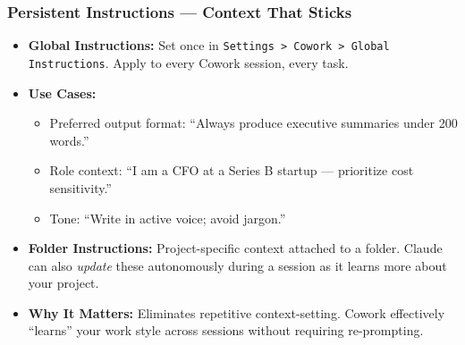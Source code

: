 \begin{frame}[fragile]\frametitle{Persistent Instructions — Context That Sticks}
  \begin{itemize}
    \item \textbf{Global Instructions:} Set once in \texttt{Settings > Cowork > Global Instructions}. Apply to every Cowork session, every task.
    \item \textbf{Use Cases:}
      \begin{itemize}
        \item Preferred output format: ``Always produce executive summaries under 200 words.''
        \item Role context: ``I am a CFO at a Series B startup — prioritize cost sensitivity.''
        \item Tone: ``Write in active voice; avoid jargon.''
      \end{itemize}
    \item \textbf{Folder Instructions:} Project-specific context attached to a folder. Claude can also \textit{update} these autonomously during a session as it learns more about your project.
    \item \textbf{Why It Matters:} Eliminates repetitive context-setting. Cowork effectively ``learns'' your work style across sessions without requiring re-prompting.
  \end{itemize}
\end{frame}

